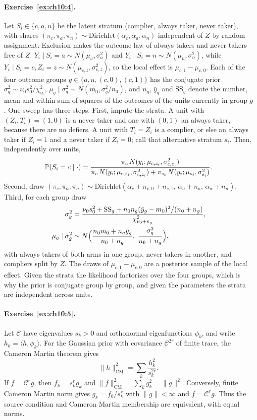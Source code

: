 \paragraph{Exercise~\ref{ex:ch10:4}.} Let $S_i \in \{c, a, n\}$ be the latent stratum (complier, always taker, never taker), with shares $(\pi_c, \pi_a, \pi_n) \sim \mathrm{Dirichlet}(\alpha_c, \alpha_a, \alpha_n)$ independent of $Z$ by random assignment. Exclusion makes the outcome law of always takers and never takers free of $Z$: $Y_i \mid S_i = a \sim N(\mu_a, \sigma_a^2)$ and $Y_i \mid S_i = n \sim N(\mu_n, \sigma_n^2)$, while $Y_i \mid S_i = c, Z_i = z \sim N(\mu_{c,z}, \sigma_{c,z}^2)$, so the local effect is $\mu_{c,1} - \mu_{c,0}$. Each of the four outcome groups $g \in \{a, n, (c,0), (c,1)\}$ has the conjugate prior $\sigma_g^2 \sim \nu_0 s_0^2/\chi^2_{\nu_0}$, $\mu_g \mid \sigma_g^2 \sim N(m_0, \sigma_g^2/n_0)$, and $n_g$, $\bar y_g$ and $\mathrm{SS}_g$ denote the number, mean and within sum of squares of the outcomes of the units currently in group $g$. One sweep has three steps. First, impute the strata. A unit with $(Z_i, T_i) = (1, 0)$ is a never taker and one with $(0, 1)$ an always taker, because there are no defiers. A unit with $T_i = Z_i$ is a complier, or else an always taker if $Z_i = 1$ and a never taker if $Z_i = 0$; call that alternative stratum $s_i$. Then, independently over units,
\[
\mathbb{P}(S_i = c \mid \cdot) = \frac{\pi_c\,N(y_i; \mu_{c,z_i}, \sigma_{c,z_i}^2)}{\pi_c\,N(y_i; \mu_{c,z_i}, \sigma_{c,z_i}^2) + \pi_{s_i}\,N(y_i; \mu_{s_i}, \sigma_{s_i}^2)}.
\]
Second, draw $(\pi_c, \pi_a, \pi_n) \sim \mathrm{Dirichlet}(\alpha_c + n_{c,0} + n_{c,1},\, \alpha_a + n_a,\, \alpha_n + n_n)$. Third, for each group draw
\begin{align*}
\sigma_g^2 &= \frac{\nu_0 s_0^2 + \mathrm{SS}_g + n_0n_g(\bar y_g - m_0)^2/(n_0 + n_g)}{\chi^2_{\nu_0 + n_g}}, \\
\mu_g \mid \sigma_g^2 &\sim N\Bigl(\frac{n_0m_0 + n_g\bar y_g}{n_0 + n_g},\; \frac{\sigma_g^2}{n_0 + n_g}\Bigr),
\end{align*}
with always takers of both arms in one group, never takers in another, and compliers split by $Z$. The draws of $\mu_{c,1} - \mu_{c,0}$ are a posterior sample of the local effect. Given the strata the likelihood factorizes over the four groups, which is why the prior is conjugate group by group, and given the parameters the strata are independent across units.

\paragraph{Exercise~\ref{ex:ch10:5}.} Let $\mathcal C$ have eigenvalues $s_k > 0$ and orthonormal eigenfunctions $\phi_k$, and write $h_k = \langle h, \phi_k\rangle$. For the Gaussian prior with covariance $\mathcal C^{2r}$ of finite trace, the Cameron Martin theorem gives
\[
\|h\|_{\mathrm{CM}}^2 = \sum_k \frac{h_k^2}{s_k^{2r}}.
\]
If $f = \mathcal C^r g$, then $f_k = s_k^r g_k$ and $\|f\|_{\mathrm{CM}}^2 = \sum_k g_k^2 = \|g\|^2$. Conversely, finite Cameron Martin norm gives $g_k = f_k/s_k^r$ with $\|g\| < \infty$ and $f = \mathcal C^r g$. Thus the source condition and Cameron Martin membership are equivalent, with equal norms.

